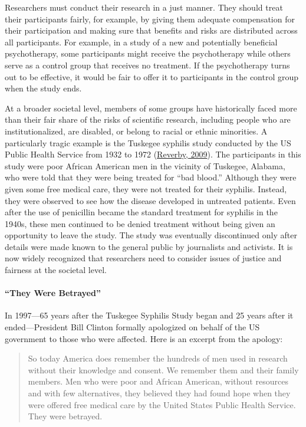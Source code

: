 \documentclass[
]{krantz}
\begin{document}
Researchers must conduct their research in a just manner. They should treat their participants fairly, for example, by giving them adequate compensation for their participation and making sure that benefits and risks are distributed across all participants. For example, in a study of a new and potentially beneficial psychotherapy, some participants might receive the psychotherapy while others serve as a control group that receives no treatment. If the psychotherapy turns out to be effective, it would be fair to offer it to participants in the control group when the study ends.

At a broader societal level, members of some groups have historically faced more than their fair share of the risks of scientific research, including people who are institutionalized, are disabled, or belong to racial or ethnic minorities. A particularly tragic example is the Tuskegee syphilis study conducted by the US Public Health Service from 1932 to 1972 (\protect\hyperlink{ref-reverby2009examining}{Reverby, 2009}). The participants in this study were poor African American men in the vicinity of Tuskegee, Alabama, who were told that they were being treated for ``bad blood.'' Although they were given some free medical care, they were not treated for their syphilis. Instead, they were observed to see how the disease developed in untreated patients. Even after the use of penicillin became the standard treatment for syphilis in the 1940s, these men continued to be denied treatment without being given an opportunity to leave the study. The study was eventually discontinued only after details were made known to the general public by journalists and activists. It is now widely recognized that researchers need to consider issues of justice and fairness at the societal level.

\hypertarget{they-were-betrayed}{%
\paragraph*{``They Were Betrayed''}\label{they-were-betrayed}}

In 1997---65 years after the Tuskegee Syphilis Study began and 25 years after it ended---President Bill Clinton formally apologized on behalf of the US government to those who were affected. Here is an excerpt from the apology:

\begin{quote}
So today America does remember the hundreds of men used in research without their knowledge and consent. We remember them and their family members. Men who were poor and African American, without resources and with few alternatives, they believed they had found hope when they were offered free medical care by the United States Public Health Service. They were betrayed.
\end{quote}
\end{document}
